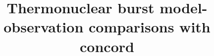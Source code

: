 \documentclass{aastex61}
\begin{document}
\title{Thermonuclear burst model-observation comparisons with {\sc concord}}


\end{document}
